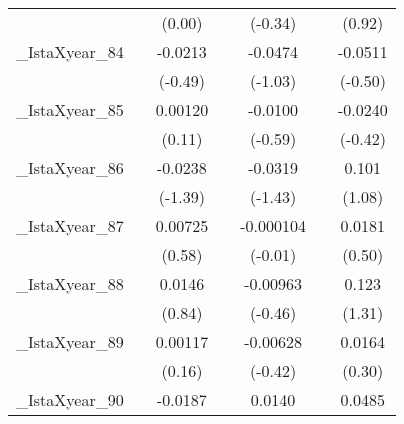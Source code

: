 {\begin{tabular}{l*{6}{c}}
            &                     &      (0.00)         &                     &     (-0.34)         &                     &      (0.92)         \\
[1em]
\_IstaXyear\_84&                     &     -0.0213         &                     &     -0.0474         &                     &     -0.0511         \\
            &                     &     (-0.49)         &                     &     (-1.03)         &                     &     (-0.50)         \\
[1em]
\_IstaXyear\_85&                     &     0.00120         &                     &     -0.0100         &                     &     -0.0240         \\
            &                     &      (0.11)         &                     &     (-0.59)         &                     &     (-0.42)         \\
[1em]
\_IstaXyear\_86&                     &     -0.0238         &                     &     -0.0319         &                     &       0.101         \\
            &                     &     (-1.39)         &                     &     (-1.43)         &                     &      (1.08)         \\
[1em]
\_IstaXyear\_87&                     &     0.00725         &                     &   -0.000104         &                     &      0.0181         \\
            &                     &      (0.58)         &                     &     (-0.01)         &                     &      (0.50)         \\
[1em]
\_IstaXyear\_88&                     &      0.0146         &                     &    -0.00963         &                     &       0.123         \\
            &                     &      (0.84)         &                     &     (-0.46)         &                     &      (1.31)         \\
[1em]
\_IstaXyear\_89&                     &     0.00117         &                     &    -0.00628         &                     &      0.0164         \\
            &                     &      (0.16)         &                     &     (-0.42)         &                     &      (0.30)         \\
[1em]
\_IstaXyear\_90&                     &     -0.0187         &                     &      0.0140         &                     &      0.0485         \\

\end{tabular}}
